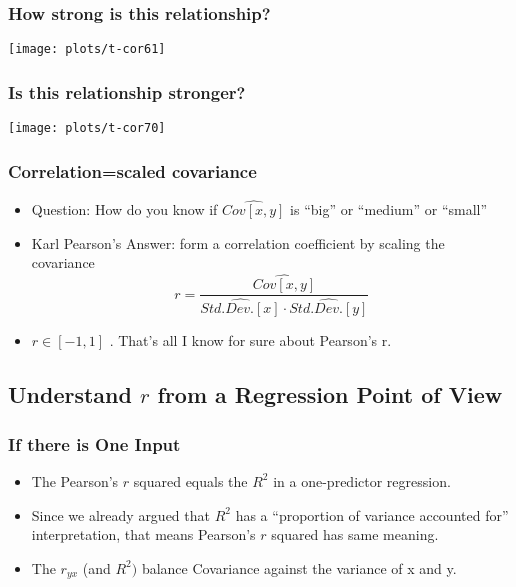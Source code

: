 \documentclass[10pt,english]{beamer}
\def\lyxframeend{} %
\begin{document}
\begin{frame}[containsverbatim]
\frametitle{How strong is this relationship?}


\texttt{[image: plots/t-cor61]}

\end{frame}

\begin{frame}[containsverbatim]
\frametitle{Is this relationship stronger?}


\texttt{[image: plots/t-cor70]}

\end{frame}

\begin{frame}[containsverbatim]
\frametitle{Correlation=scaled covariance}
\begin{itemize}
\item Question: How do you know if $\widehat{Cov[x,y]}$ is ``big'' or
``medium'' or ``small''
\item Karl Pearson's Answer: form a correlation coefficient by scaling the
covariance 
\begin{equation}
r=\frac{\widehat{Cov[x,y]}}{\widehat{Std.Dev.[x]}\cdot\widehat{Std.Dev.[y]}}
\end{equation}

\item $r\in[-1,1]$ . That's all I know for sure about Pearson's r.
\end{itemize}
\end{frame}


\lyxframeend{}\subsection{Understand $r$ from a Regression Point of View}

\begin{frame}
\frametitle{If there is One Input}
\begin{itemize}
\item The Pearson's $r$ squared equals the $R^{2}$ in a one-predictor
regression.
\item Since we already argued that $R^{2}$ has a ``proportion of variance
accounted for'' interpretation, that means Pearson's $r$ squared
has same meaning.
\item The $r_{yx}$ (and $R^{2})$ balance Covariance against the variance
of x and y.
\end{itemize}
\end{frame}
\end{document}
